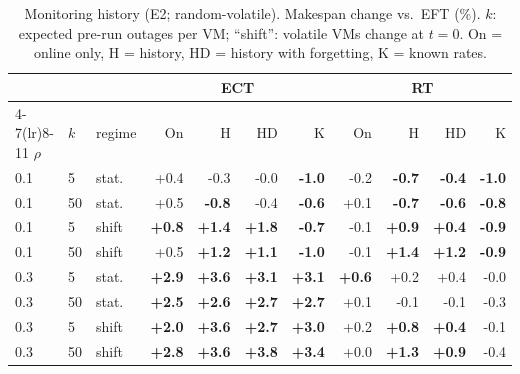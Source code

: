 \begin{table}[t]\centering\scriptsize
\caption{Monitoring history (E2; random-volatile). Makespan change vs.\ EFT (\%). $k$: expected pre-run outages per VM; ``shift'': volatile VMs change at $t=0$. On = online only, H = history, HD = history with forgetting, K = known rates.}\label{tab:history}
\setlength{\tabcolsep}{2.5pt}\begin{tabular}{lll rrrr rrrr}
\toprule
 & & & \multicolumn{4}{c}{ECT} & \multicolumn{4}{c}{RT} \\ \cmidrule(lr){4-7}\cmidrule(lr){8-11}
$\rho$ & $k$ & regime & On & H & HD & K & On & H & HD & K\\
\midrule
0.1 & 5 & stat. & +0.4 & -0.3 & -0.0 & \textbf{-1.0} & -0.2 & \textbf{-0.7} & \textbf{-0.4} & \textbf{-1.0}\\
0.1 & 50 & stat. & +0.5 & \textbf{-0.8} & -0.4 & \textbf{-0.6} & +0.1 & \textbf{-0.7} & \textbf{-0.6} & \textbf{-0.8}\\
0.1 & 5 & shift & \textbf{+0.8} & \textbf{+1.4} & \textbf{+1.8} & \textbf{-0.7} & -0.1 & \textbf{+0.9} & \textbf{+0.4} & \textbf{-0.9}\\
0.1 & 50 & shift & +0.5 & \textbf{+1.2} & \textbf{+1.1} & \textbf{-1.0} & -0.1 & \textbf{+1.4} & \textbf{+1.2} & \textbf{-0.9}\\
0.3 & 5 & stat. & \textbf{+2.9} & \textbf{+3.6} & \textbf{+3.1} & \textbf{+3.1} & \textbf{+0.6} & +0.2 & +0.4 & -0.0\\
0.3 & 50 & stat. & \textbf{+2.5} & \textbf{+2.6} & \textbf{+2.7} & \textbf{+2.7} & +0.1 & -0.1 & -0.1 & -0.3\\
0.3 & 5 & shift & \textbf{+2.0} & \textbf{+3.6} & \textbf{+2.7} & \textbf{+3.0} & +0.2 & \textbf{+0.8} & \textbf{+0.4} & -0.1\\
0.3 & 50 & shift & \textbf{+2.8} & \textbf{+3.6} & \textbf{+3.8} & \textbf{+3.4} & +0.0 & \textbf{+1.3} & \textbf{+0.9} & -0.4\\
\bottomrule\end{tabular}\end{table}